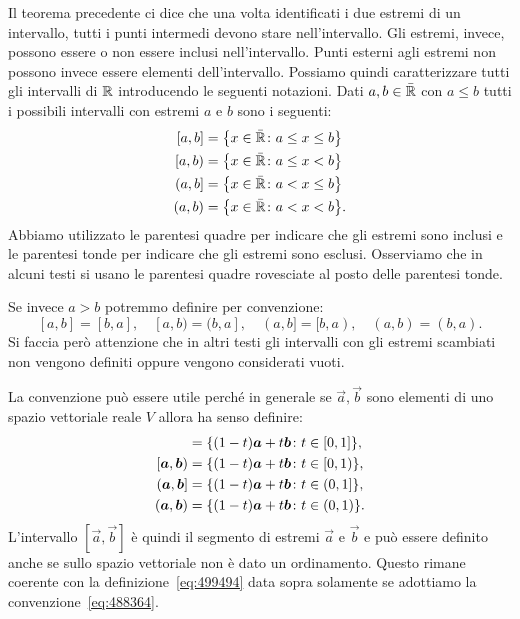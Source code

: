 Il teorema precedente ci dice che una volta identificati i due estremi
di un intervallo, tutti i punti intermedi devono stare nell'intervallo.
Gli estremi, invece, possono essere o non essere inclusi nell'intervallo.
Punti esterni agli estremi non possono invece essere elementi dell'intervallo.
Possiamo quindi caratterizzare tutti gli intervalli di ${\mathbb R}$
introducendo le seguenti notazioni. Dati $a,b\in \bar {{\mathbb R}}$ con $a\le b$
tutti i possibili intervalli con estremi $a$ e $b$ sono i seguenti:
\begin{equation}\label{eq:499494}
\begin{aligned}
\left[a,b\right] &= {\left\{ x\in \bar {{\mathbb R}}\colon a \le x \le b \right\}} \\
\left[a,b\right) &= {\left\{ x\in \bar {{\mathbb R}}\colon a \le x < b \right\}} \\
\left(a,b\right] &= {\left\{ x\in \bar {{\mathbb R}}\colon a < x \le b \right\}}\\
\left(a,b\right) &= {\left\{ x\in \bar {{\mathbb R}}\colon a < x < b \right\}}.
\end{aligned}
\end{equation}
Abbiamo utilizzato le parentesi quadre per indicare che gli estremi
sono inclusi e le parentesi tonde per indicare che gli estremi sono esclusi.
Osserviamo che in alcuni testi si usano le parentesi quadre rovesciate al posto
delle parentesi tonde.

Se invece $a>b$ potremmo definire per convenzione:
\begin{equation}\label{eq:488364}
  [a,b] = [b,a], \quad
  [a,b) = (b,a], \quad
  (a,b] = [b,a), \quad
  (a,b) = (b,a).
\end{equation}
Si faccia però attenzione che in altri testi gli intervalli con gli estremi
scambiati non vengono definiti oppure vengono considerati vuoti.

La convenzione può essere utile perché in generale se $\vec a, \vec b$ sono
elementi di uno spazio vettoriale reale $V$ allora ha senso
definire:
\begin{align*}
    [\vec a,\vec b] &= \ENCLOSE{(1-t)\vec a + t \vec b\colon t\in [0,1]},\\
    [\vec a,\vec b) &= \ENCLOSE{(1-t)\vec a + t \vec b\colon t\in [0,1)},\\
    (\vec a,\vec b] &= \ENCLOSE{(1-t)\vec a + t \vec b\colon t\in (0,1]},\\
    (\vec a,\vec b) &= \ENCLOSE{(1-t)\vec a + t \vec b\colon t\in (0,1)}.
\end{align*}
L'intervallo $[\vec a,\vec b]$ è quindi il segmento di estremi
$\vec a$ e $\vec b$ e può essere definito anche se sullo spazio
vettoriale non è dato un ordinamento.
Questo rimane coerente con la definizione~\eqref{eq:499494}
data sopra solamente se adottiamo la convenzione~\eqref{eq:488364}.

